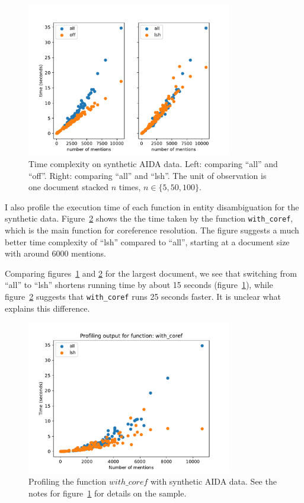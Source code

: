 \documentclass[a4paper,11pt]{article}
\numberwithin{equation}{section} %
\begin{document}
\begin{figure}[H]
  \centering
  \includegraphics[width = 0.8\textwidth]{../figs/timing_aida_scale.pdf}
  \caption{Time complexity on synthetic AIDA data. Left: comparing ``all'' and ``off''. Right: comparing ``all'' and ``lsh''. The unit of observation is one document stacked $n$ times, 
  $n \in \{5, 50, 100\}$.}
  \label{fig:timing_aida_scale}
\end{figure}

I also profile the execution time of each function in entity disambiguation for the synthetic data. Figure~\ref{fig:profile_aida_scale} shows the the time taken by the function \verb|with_coref|, which is the main function for coreference resolution. The figure suggests a much better time complexity of ``lsh'' compared to ``all'', starting at a document size with around 6000 mentions.

Comparing figures~\ref{fig:timing_aida_scale} and \ref{fig:profile_aida_scale} for the largest document, we see that  switching from ``all'' to ``lsh'' shortens running time by about 15 seconds (figure~\ref{fig:timing_aida_scale}), while figure~\ref{fig:profile_aida_scale} suggests that \verb|with_coref| runs 25 seconds faster. It is unclear what explains this difference. 


\begin{figure}[H]
  \centering
  \includegraphics[width = 0.8\textwidth]{../figs/profile_aida_scale.pdf}
  \caption{Profiling the function $with\_coref$ with synthetic AIDA data. See the notes for figure~\ref{fig:timing_aida_scale} for details on the sample.}
  \label{fig:profile_aida_scale}
\end{figure}
\end{document}
